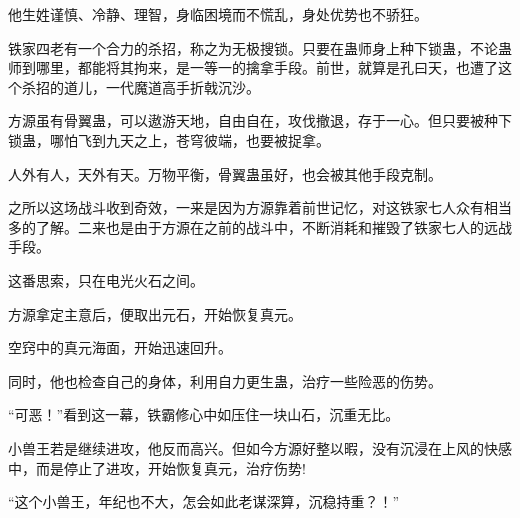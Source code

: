 \begin{this_body}
他生姓谨慎、冷静、理智，身临困境而不慌乱，身处优势也不骄狂。

铁家四老有一个合力的杀招，称之为无极搜锁。只要在蛊师身上种下锁蛊，不论蛊师到哪里，都能将其拘来，是一等一的擒拿手段。前世，就算是孔曰天，也遭了这个杀招的道儿，一代魔道高手折戟沉沙。

方源虽有骨翼蛊，可以遨游天地，自由自在，攻伐撤退，存于一心。但只要被种下锁蛊，哪怕飞到九天之上，苍穹彼端，也要被捉拿。

人外有人，天外有天。万物平衡，骨翼蛊虽好，也会被其他手段克制。

之所以这场战斗收到奇效，一来是因为方源靠着前世记忆，对这铁家七人众有相当多的了解。二来也是由于方源在之前的战斗中，不断消耗和摧毁了铁家七人的远战手段。

这番思索，只在电光火石之间。

方源拿定主意后，便取出元石，开始恢复真元。

空窍中的真元海面，开始迅速回升。

同时，他也检查自己的身体，利用自力更生蛊，治疗一些险恶的伤势。

“可恶！”看到这一幕，铁霸修心中如压住一块山石，沉重无比。

小兽王若是继续进攻，他反而高兴。但如今方源好整以暇，没有沉浸在上风的快感中，而是停止了进攻，开始恢复真元，治疗伤势!

“这个小兽王，年纪也不大，怎会如此老谋深算，沉稳持重？！”

\end{this_body}

